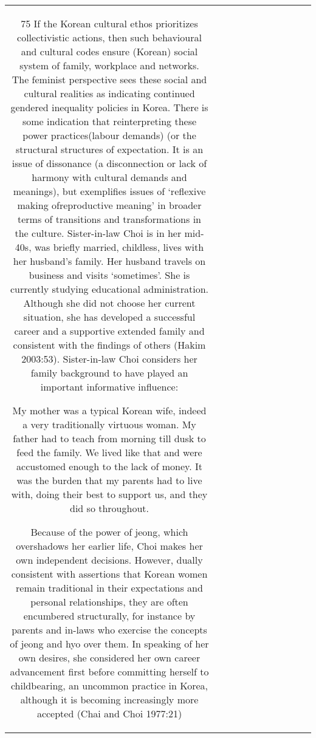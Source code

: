 \begin{table}[h!]
\begin{tabular}{|c|c|c|c|c|c|c|c|c|c|c|}
{75 If the Korean cultural ethos prioritizes collectivistic actions, then such behavioural and cultural codes ensure (Korean) social system of family, workplace and networks. The feminist perspective sees these social and cultural realities as indicating continued gendered inequality policies in Korea. There is some indication that reinterpreting these power practices(labour demands) (or the structural
structures of expectation. It is an issue of dissonance (a disconnection or lack of harmony with cultural demands and meanings), but exemplifies issues of ‘reflexive making ofreproductive meaning’ in broader terms of transitions and transformations in the culture.
Sister-in-law Choi is in her mid-40s, was briefly married, childless, lives with her husband’s family. Her husband travels on business and visits ‘sometimes’. She is currently studying educational administration. Although she did not choose her current situation, she has developed a successful career and a supportive extended family and consistent with the findings of others (Hakim 2003:53). Sister-in-law Choi considers her family background to have played an important informative influence:

My mother was a typical Korean wife, indeed a very traditionally virtuous woman. My father had to teach from morning till dusk to feed the family. We lived like that and were accustomed enough to the lack of money. It was the burden that my parents had to live with, doing their best to support us, and they did so throughout.

Because of the power of jeong, which overshadows her earlier life, Choi makes her own independent decisions. However, dually consistent with assertions that Korean women remain traditional in their expectations and personal relationships, they are often encumbered structurally, for instance by parents and in-laws who exercise the concepts of jeong and hyo over them. In speaking of her own desires, she considered her own career advancement first before committing herself to childbearing, an uncommon practice in Korea, although it is becoming increasingly more accepted (Chai and Choi 1977:21)

}
\end{tabular}
\end{table}
